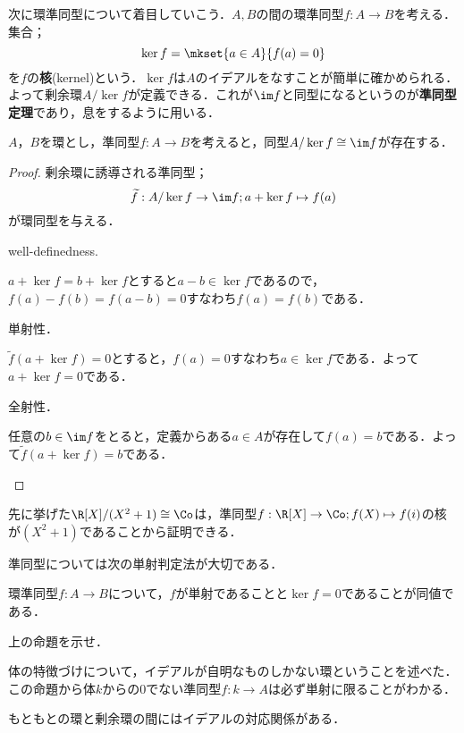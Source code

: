 次に環準同型について着目していこう．$A,B$の間の環準同型$f:A\to B$を考える．集合；
\[\ker f=\mkset{a\in A}{f(a)=0}\]
を$f$の\textbf{核}(kernel)という．$\ker f$は$A$のイデアルをなすことが簡単に確かめられる．よって剰余環$A/\ker f$が定義できる．これが$\im f$と同型になるというのが\textbf{準同型定理}であり，息をするように用いる．

\begin{thm}[準同型定理]
	$A，B$を環とし，準同型$f:A\to B$を考えると，同型$A/\ker f\cong\im f$が存在する．
\end{thm}

\begin{proof}
	剰余環に誘導される準同型；
	\[\widetilde f:A/\ker f\to\im f;a+\ker f\mapsto f(a)\]
	が環同型を与える．
	\begin{step}
		\item well-definedness.
		
		$a+\ker f=b+\ker f$とすると$a-b\in\ker f$であるので，$f(a)-f(b)=f(a-b)=0$すなわち$f(a)=f(b)$である．
		
		\item 単射性．
		
		$\widetilde f(a+\ker f)=0$とすると，$f(a)=0$すなわち$a\in\ker f$である．よって$a+\ker f=0$である．
		
		\item 全射性．
		
		任意の$b\in \im f$をとると，定義からある$a\in A$が存在して$f(a)=b$である．よって$\widetilde f(a+\ker f)=b$である．
	\end{step}
\end{proof}

先に挙げた$\R[X]/(X^2+1)\cong \Co$は，準同型$f:\R[X]\to\Co;f(X)\mapsto f(i)$の核が$(X^2+1)$であることから証明できる．

準同型については次の単射判定法が大切である．
\begin{prop}
	環準同型$f:A\to B$について，$f$が単射であることと$\ker f=0$であることが同値である．
\end{prop}

\begin{exer}
	上の命題を示せ．
\end{exer}

体の特徴づけについて，イデアルが自明なものしかない環ということを述べた．この命題から体$k$からの$0$でない準同型$f:k\to A$は必ず単射に限ることがわかる．

もともとの環と剰余環の間にはイデアルの対応関係がある．

